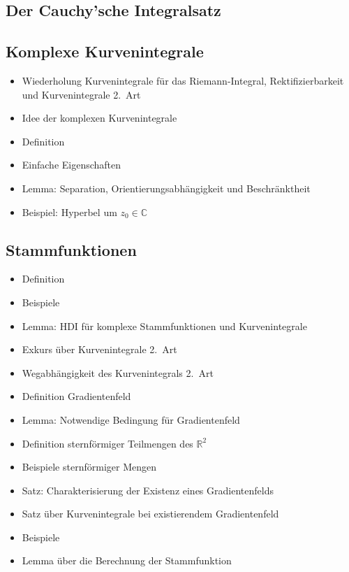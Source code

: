 \documentclass[8pt,a4paper,fleqn]{article}
\newcommand\setComplex{\mathds{C}}
\newcommand\setReal{\mathds{R}}
\begin{document}
\begin{multicols}{2}
  \section{Der Cauchy'sche Integralsatz} %
  \label{sec:der_cauchy_sche_integralsatz}
  \subsection{Komplexe Kurvenintegrale} %
  \label{sub:komplexe_kurvenintegrale}
  \begin{itemize}
    \item Wiederholung Kurvenintegrale für das Riemann-Integral, Rektifizierbarkeit und Kurvenintegrale 2.~Art
    \item Idee der komplexen Kurvenintegrale
    \item Definition
    \item Einfache Eigenschaften
    \item Lemma: Separation, Orientierungsabhängigkeit und Beschränktheit
    \item Beispiel: Hyperbel um $z_0 \in \setComplex$
  \end{itemize}

  \subsection{Stammfunktionen} %
  \label{sub:stammfunktionen}
  \begin{itemize}
    \item Definition
    \item Beispiele
    \item Lemma: HDI für komplexe Stammfunktionen und Kurvenintegrale
    \item Exkurs über Kurvenintegrale 2.~Art
    \item Wegabhängigkeit des Kurvenintegrals 2.~Art
    \item Definition Gradientenfeld
    \item Lemma: Notwendige Bedingung für Gradientenfeld
    \item Definition sternförmiger Teilmengen des $\setReal^2$
    \item Beispiele sternförmiger Mengen
    \item Satz: Charakterisierung der Existenz eines Gradientenfelds
    \item Satz über Kurvenintegrale bei existierendem Gradientenfeld
    \item Beispiele
    \item Lemma über die Berechnung der Stammfunktion
  \end{itemize}


\end{multicols}
\end{document}
